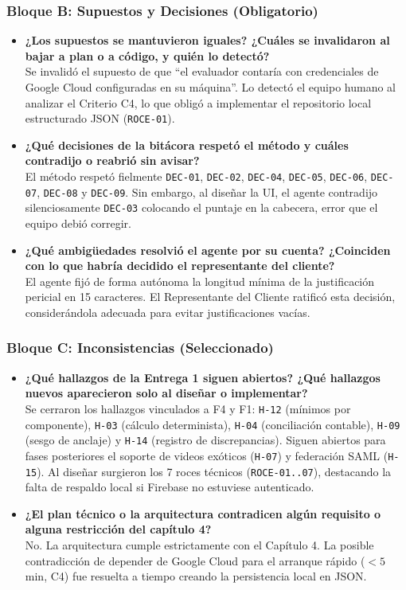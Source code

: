 \documentclass[11pt,letterpaper]{article}
\begin{document}
\subsubsection{Bloque B: Supuestos y Decisiones (Obligatorio)}
\begin{itemize}
    \item \textbf{¿Los supuestos se mantuvieron iguales? ¿Cuáles se invalidaron al bajar a plan o a código, y quién lo detectó?}\\
    Se invalidó el supuesto de que ``el evaluador contaría con credenciales de Google Cloud configuradas en su máquina''. Lo detectó el equipo humano al analizar el Criterio C4, lo que obligó a implementar el repositorio local estructurado JSON (\texttt{ROCE-01}).
    \item \textbf{¿Qué decisiones de la bitácora respetó el método y cuáles contradijo o reabrió sin avisar?}\\
    El método respetó fielmente \texttt{DEC-01}, \texttt{DEC-02}, \texttt{DEC-04}, \texttt{DEC-05}, \texttt{DEC-06}, \texttt{DEC-07}, \texttt{DEC-08} y \texttt{DEC-09}. Sin embargo, al diseñar la UI, el agente contradijo silenciosamente \texttt{DEC-03} colocando el puntaje en la cabecera, error que el equipo debió corregir.
    \item \textbf{¿Qué ambigüedades resolvió el agente por su cuenta? ¿Coinciden con lo que habría decidido el representante del cliente?}\\
    El agente fijó de forma autónoma la longitud mínima de la justificación pericial en 15 caracteres. El Representante del Cliente ratificó esta decisión, considerándola adecuada para evitar justificaciones vacías.
\end{itemize}

\subsubsection{Bloque C: Inconsistencias (Seleccionado)}
\begin{itemize}
    \item \textbf{¿Qué hallazgos de la Entrega 1 siguen abiertos? ¿Qué hallazgos nuevos aparecieron solo al diseñar o implementar?}\\
    Se cerraron los hallazgos vinculados a F4 y F1: \texttt{H-12} (mínimos por componente), \texttt{H-03} (cálculo determinista), \texttt{H-04} (conciliación contable), \texttt{H-09} (sesgo de anclaje) y \texttt{H-14} (registro de discrepancias). Siguen abiertos para fases posteriores el soporte de videos exóticos (\texttt{H-07}) y federación SAML (\texttt{H-15}). Al diseñar surgieron los 7 roces técnicos (\texttt{ROCE-01..07}), destacando la falta de respaldo local si Firebase no estuviese autenticado.
    \item \textbf{¿El plan técnico o la arquitectura contradicen algún requisito o alguna restricción del capítulo 4?}\\
    No. La arquitectura cumple estrictamente con el Capítulo 4. La posible contradicción de depender de Google Cloud para el arranque rápido ($<5$ min, C4) fue resuelta a tiempo creando la persistencia local en JSON.
\end{itemize}
\end{document}
